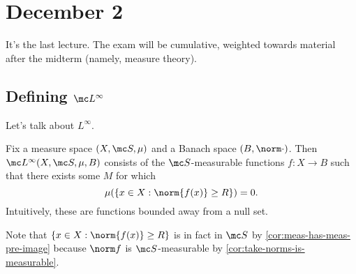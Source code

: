 \documentclass[../notes.tex]{subfiles}
\begin{document}
\section{December 2}

It's the last lecture. The exam will be cumulative, weighted towards material after the midterm (namely, measure theory).

\subsection{Defining \texorpdfstring{$\mc L^\infty$}{ L inf}}
Let's talk about $L^\infty$.
\begin{notation}
	Fix a measure space $(X,\mc S,\mu)$ and a Banach space $(B,\norm\cdot)$. Then $\mc L^\infty(X,\mc S,\mu,B)$ consists of the $\mc S$-measurable functions $f\colon X\to B$ such that there exists some $M$ for which
	\[\mu(\{x\in X:\norm{f(x)}\ge R\})=0.\]
	Intuitively, these are functions bounded away from a null set.
\end{notation}
Note that $\{x\in X:\norm{f(x)}\ge R\}$ is in fact in $\mc S$ by \autoref{cor:meas-has-meas-pre-image} because $\norm f$ is $\mc S$-measurable by \autoref{cor:take-norms-is-measurable}.
\end{document}
